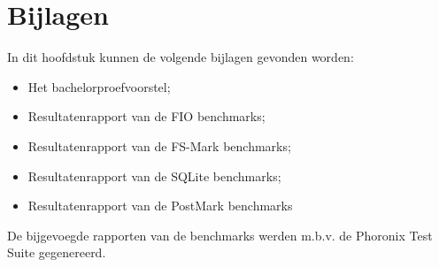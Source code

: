 \chapter{Bijlagen}
\label{ch:bijlagen}

In dit hoofdstuk kunnen de volgende bijlagen gevonden worden:

\begin{itemize}
  \item{Het bachelorproefvoorstel;}
  \item{Resultatenrapport van de FIO benchmarks;}
  \item{Resultatenrapport van de FS-Mark benchmarks;}
  \item{Resultatenrapport van de SQLite benchmarks;}
  \item{Resultatenrapport van de PostMark benchmarks}
\end{itemize}

De bijgevoegde rapporten van de benchmarks werden m.b.v. de Phoronix Test Suite gegenereerd.















